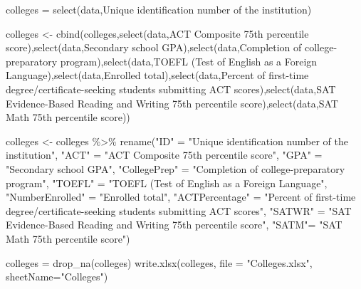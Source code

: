 \documentclass[
]{article}
\newenvironment{Shaded}{\begin{snugshade}}{\end{snugshade}}
\newcommand{\AttributeTok}[1]{\textcolor[rgb]{0.77,0.63,0.00}{#1}}
\newcommand{\FunctionTok}[1]{\textcolor[rgb]{0.00,0.00,0.00}{#1}}
\newcommand{\NormalTok}[1]{#1}
\newcommand{\OtherTok}[1]{\textcolor[rgb]{0.56,0.35,0.01}{#1}}
\newcommand{\SpecialCharTok}[1]{\textcolor[rgb]{0.00,0.00,0.00}{#1}}
\newcommand{\StringTok}[1]{\textcolor[rgb]{0.31,0.60,0.02}{#1}}
\begin{document}
\begin{Shaded}
\begin{Highlighting}[]
\NormalTok{colleges }\OtherTok{=} \FunctionTok{select}\NormalTok{(data,}\StringTok{\textquotesingle{}Unique identification number of the institution\textquotesingle{}}\NormalTok{)}

\NormalTok{colleges }\OtherTok{\textless{}{-}} \FunctionTok{cbind}\NormalTok{(colleges,}\FunctionTok{select}\NormalTok{(data,}\StringTok{\textquotesingle{}ACT Composite 75th percentile score\textquotesingle{}}\NormalTok{),}\FunctionTok{select}\NormalTok{(data,}\StringTok{\textquotesingle{}Secondary school GPA\textquotesingle{}}\NormalTok{),}\FunctionTok{select}\NormalTok{(data,}\StringTok{\textquotesingle{}Completion of college{-}preparatory program\textquotesingle{}}\NormalTok{),}\FunctionTok{select}\NormalTok{(data,}\StringTok{\textquotesingle{}TOEFL (Test of English as a Foreign Language\textquotesingle{}}\NormalTok{),}\FunctionTok{select}\NormalTok{(data,}\StringTok{\textquotesingle{}Enrolled total\textquotesingle{}}\NormalTok{),}\FunctionTok{select}\NormalTok{(data,}\StringTok{\textquotesingle{}Percent of first{-}time degree/certificate{-}seeking students submitting ACT scores\textquotesingle{}}\NormalTok{),}\FunctionTok{select}\NormalTok{(data,}\StringTok{\textquotesingle{}SAT Evidence{-}Based Reading and Writing 75th percentile score\textquotesingle{}}\NormalTok{),}\FunctionTok{select}\NormalTok{(data,}\StringTok{\textquotesingle{}SAT Math 75th percentile score\textquotesingle{}}\NormalTok{))}

\NormalTok{colleges }\OtherTok{\textless{}{-}}\NormalTok{ colleges }\SpecialCharTok{\%\textgreater{}\%} 
        \FunctionTok{rename}\NormalTok{(}\StringTok{"ID"} \OtherTok{=} \StringTok{"Unique identification number of the institution"}\NormalTok{,}
               \StringTok{"ACT"} \OtherTok{=} \StringTok{"ACT Composite 75th percentile score"}\NormalTok{,}
               \StringTok{"GPA"} \OtherTok{=} \StringTok{"Secondary school GPA"}\NormalTok{,}
               \StringTok{"CollegePrep"} \OtherTok{=} \StringTok{"Completion of college{-}preparatory program"}\NormalTok{,}
               \StringTok{"TOEFL"} \OtherTok{=} \StringTok{"TOEFL (Test of English as a Foreign Language"}\NormalTok{,}
               \StringTok{"NumberEnrolled"} \OtherTok{=} \StringTok{"Enrolled total"}\NormalTok{,}
               \StringTok{"ACTPercentage"} \OtherTok{=} \StringTok{"Percent of first{-}time degree/certificate{-}seeking students submitting ACT scores"}\NormalTok{,}
               \StringTok{"SATWR"} \OtherTok{=} \StringTok{"SAT Evidence{-}Based Reading and Writing 75th percentile score"}\NormalTok{,}
              \StringTok{"SATM"}\OtherTok{=} \StringTok{"SAT Math 75th percentile score"}\NormalTok{)}

\NormalTok{colleges }\OtherTok{=} \FunctionTok{drop\_na}\NormalTok{(colleges)}
\FunctionTok{write.xlsx}\NormalTok{(colleges, }\AttributeTok{file =} \StringTok{"Colleges.xlsx"}\NormalTok{, }\AttributeTok{sheetName=}\StringTok{"Colleges"}\NormalTok{)}
\end{Highlighting}
\end{Shaded}
\end{document}
